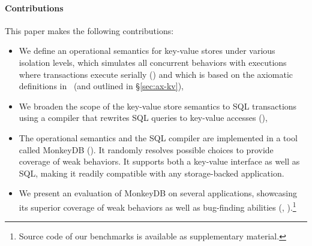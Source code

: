\paragraph{Contributions}

This paper makes the following contributions:
\begin{itemize}
\item We define an operational semantics for key-value stores under various
  isolation levels, which simulates all concurrent behaviors with executions
  where transactions execute serially () and which is based 
  on the axiomatic definitions in~\cite{DBLP:journals/pacmpl/BiswasE19} (and outlined in \S\ref{sec:ax-kv}),
\item We broaden the scope of the key-value store semantics to SQL transactions
  using a compiler that rewrites SQL queries to key-value accesses (),
\item The operational semantics and the SQL compiler are implemented in a tool
  called MonkeyDB (). It randomly resolves possible choices to provide coverage
  of weak behaviors. It supports both a key-value interface as well as SQL,
  making it readily compatible with any storage-backed application.
\item We present an evaluation of MonkeyDB on several applications, showcasing
its superior coverage of weak behaviors as well as bug-finding abilities
(, ).\footnote{Source code of our benchmarks is available
as supplementary material.}
\end{itemize}



 


 



